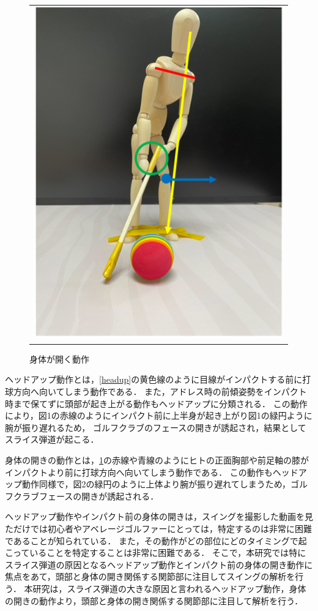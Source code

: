 \begin{figure}
\begin{center}
\begin{tabular}{c}
            \begin{minipage}{0.5\hsize}
                \begin{center}
                    \includegraphics{./images/opening.png}
                    \caption{身体が開く動作}
                    \label{opening}
                \end{center}
            \end{minipage}
        \end{tabular}
    \end{center}
\end{figure}

ヘッドアップ動作とは，\ref{headup}の黄色線のように目線がインパクトする前に打球方向へ向いてしまう動作である．
また，アドレス時の前傾姿勢をインパクト時まで保てずに頭部が起き上がる動作もヘッドアップに分類される．
この動作により，図1の赤線のようにインパクト前に上半身が起き上がり図1の緑円ように腕が振り遅れるため，
ゴルフクラブのフェースの開きが誘起され，結果としてスライス弾道が起こる．

身体の開きの動作とは，\ref{opening}の赤線や青線のようにヒトの正面胸部や前足軸の膝がインパクトより前に打球方向へ向いてしまう動作である．
この動作もヘッドアップ動作同様で，図2の緑円のように上体より腕が振り遅れてしまうため，ゴルフクラブフェースの開きが誘起される．

ヘッドアップ動作やインパクト前の身体の開きは，スイングを撮影した動画を見ただけでは初心者やアベレージゴルファーにとっては，特定するのは非常に困難であることが知られている．
また，その動作がどの部位にどのタイミングで起こっていることを特定することは非常に困難である．
そこで，本研究では特にスライス弾道の原因となるヘッドアップ動作とインパクト前の身体の開き動作に焦点をあて，頭部と身体の開き関係する関節部に注目してスイングの解析を行う．
本研究は，スライス弾道の大きな原因と言われるヘッドアップ動作，身体の開きの動作より，頭部と身体の開き関係する関節部に注目して解析を行う．